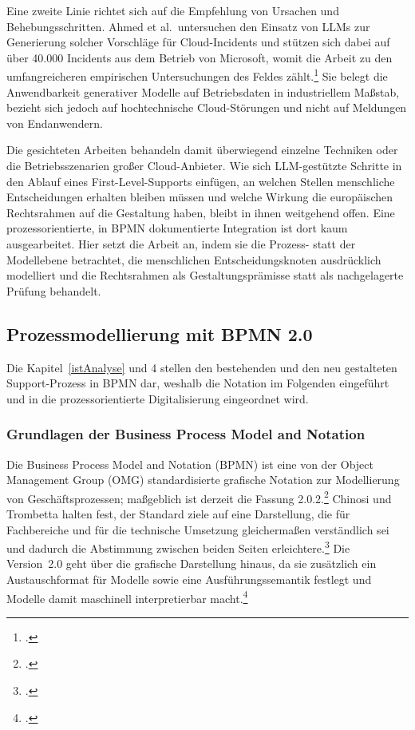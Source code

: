 Eine zweite Linie richtet sich auf die Empfehlung von Ursachen und Behebungsschritten. Ahmed et al.~untersuchen den Einsatz von LLMs zur Generierung solcher Vorschl\"age f\"ur Cloud-Incidents und st\"utzen sich dabei auf \"uber 40.000 Incidents aus dem Betrieb von Microsoft, womit die Arbeit zu den umfangreicheren empirischen Untersuchungen des Feldes z\"ahlt.\footcite[Vgl.][hier S.~1737]{Ahmed2023} Sie belegt die Anwendbarkeit generativer Modelle auf Betriebsdaten in industriellem Ma{\ss}stab, bezieht sich jedoch auf hochtechnische Cloud-St\"orungen und nicht auf Meldungen von Endanwendern.

Die gesichteten Arbeiten behandeln damit \"uberwiegend einzelne Techniken oder die Betriebsszenarien gro{\ss}er Cloud-Anbieter. Wie sich LLM-gest\"utzte Schritte in den Ablauf eines First-Level-Supports einf\"ugen, an welchen Stellen menschliche Entscheidungen erhalten bleiben m\"ussen und welche Wirkung die europ\"aischen Rechtsrahmen auf die Gestaltung haben, bleibt in ihnen weitgehend offen. Eine prozessorientierte, in BPMN dokumentierte Integration ist dort kaum ausgearbeitet. Hier setzt die Arbeit an, indem sie die Prozess- statt der Modellebene betrachtet, die menschlichen Entscheidungsknoten ausdr\"ucklich modelliert und die Rechtsrahmen als Gestaltungspr\"amisse statt als nachgelagerte Pr\"ufung behandelt.

\subsection{Prozessmodellierung mit BPMN 2.0}
\label{bpmnGrundlagen}

Die Kapitel~\ref{istAnalyse} und 4 stellen den bestehenden und den neu gestalteten Support-Prozess in BPMN dar, weshalb die Notation im Folgenden eingef\"uhrt und in die prozessorientierte Digitalisierung eingeordnet wird.

\subsubsection{Grundlagen der Business Process Model and Notation}
\label{bpmnBasics}

Die Business Process Model and Notation (BPMN) ist eine von der Object Management Group (OMG) standardisierte grafische Notation zur Modellierung von Gesch\"aftsprozessen; ma{\ss}geblich ist derzeit die Fassung 2.0.2.\footcite[Vgl.][S.~1]{OMG2013} Chinosi und Trombetta halten fest, der Standard ziele auf eine Darstellung, die f\"ur Fachbereiche und f\"ur die technische Umsetzung gleicherma\ss en verst\"andlich sei und dadurch die Abstimmung zwischen beiden Seiten erleichtere.\footcite[Vgl.][hier S.~126]{Chinosi2012} Die Version~2.0 geht \"uber die grafische Darstellung hinaus, da sie zus\"atzlich ein Austauschformat f\"ur Modelle sowie eine Ausf\"uhrungssemantik festlegt und Modelle damit maschinell interpretierbar macht.\footcites[Vgl.][S.~1]{OMG2013}[][S.~125]{Chinosi2012}

